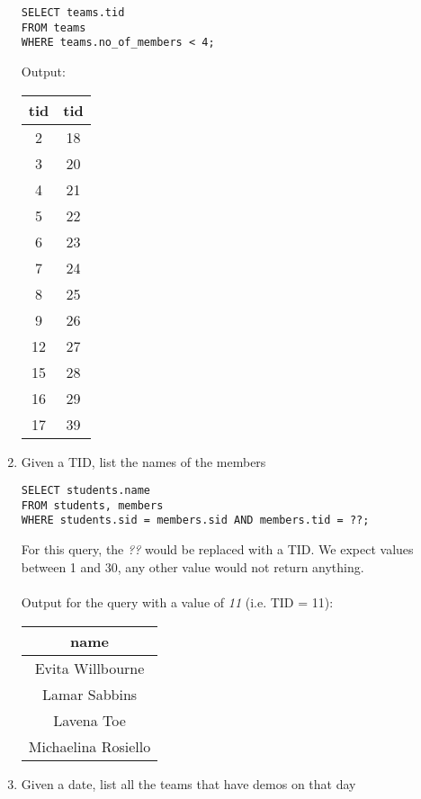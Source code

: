 \documentclass[11pt,letterpaper]{article}
\begin{document}
\begin{enumerate}
\begin{verbatim}
SELECT teams.tid 
FROM teams 
WHERE teams.no_of_members < 4;
\end{verbatim}
Output:
\begin{center}
\begin{tabular}{ | c | c | }
 \hline
 tid & tid \\
 \hline
 2 & 18 \\
 3 & 20 \\
 4 & 21 \\
 5 & 22 \\
 6 & 23 \\
 7 & 24 \\
 8 & 25 \\
 9 & 26 \\
 12 & 27 \\
 15 & 28 \\
 16 & 29 \\
 17 & 39 \\
 \hline
\end{tabular}
\end{center}

\item Given a TID, list the names of the members

\begin{verbatim}
SELECT students.name 
FROM students, members 
WHERE students.sid = members.sid AND members.tid = ??;
\end{verbatim}
For this query, the \textit{??} would be replaced with a TID. We expect values between 1 and 30, any other value would not return anything.\\
\\
Output for the query with a value of \textit{11} (i.e. TID = 11):
\begin{center}
\begin{tabular}{ | c | }
 \hline
 name \\
 \hline
 Evita Willbourne \\
 Lamar Sabbins \\
 Lavena Toe \\
 Michaelina Rosiello \\
 \hline
\end{tabular}
\end{center}

\item Given a date, list all the teams that have demos on that day


\end{enumerate}
\end{document}
